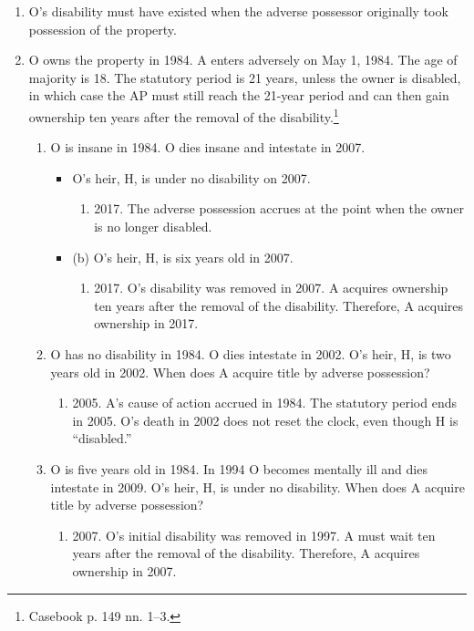 \begin{enumerate}
    \item O's disability must have existed when the adverse possessor originally 
    took possession of the property.
    \item O owns the property in 1984. A enters adversely on May 1, 1984. The 
    age of majority is 18. The statutory period is 21 years, unless the owner 
    is disabled, in which case the AP must still reach the 21-year period and 
    can then gain ownership ten years after the removal of the 
    disability.\footnote{Casebook p. 149 nn. 1--3.}
    \begin{enumerate}
        \item O is insane in 1984. O dies insane and intestate in 2007.
        \begin{itemize}
            \item O's heir, H, is under no disability on 2007.
            \begin{enumerate}
                \item 2017. The adverse possession accrues at the point when 
                the owner is no longer disabled.
            \end{enumerate}
            \item (b) O's heir, H, is six years old in 2007.
            \begin{enumerate}
                \item 2017. O's disability was removed in 2007. A acquires 
                ownership ten years after the removal of the disability. 
                Therefore, A acquires ownership in 2017.
            \end{enumerate}
        \end{itemize}
        \item O has no disability in 1984. O dies intestate in 2002. O's heir, 
        H, is two years old in 2002. When does A acquire title by adverse 
        possession?
        \begin{enumerate}
            \item 2005. A's cause of action accrued in 1984. The statutory 
            period ends in 2005. O's death in 2002 does not reset the clock, 
            even though H is ``disabled.''
        \end{enumerate}
        \item O is five years old in 1984. In 1994 O becomes mentally ill and 
        dies intestate in 2009. O's heir, H, is under no disability. When does 
        A acquire title by adverse possession?
        \begin{enumerate}
            \item 2007. O's initial disability was removed in 1997. A must 
            wait ten years after the removal of the disability. Therefore, A 
            acquires ownership in 2007.
        \end{enumerate}
    \end{enumerate}
\end{enumerate}

